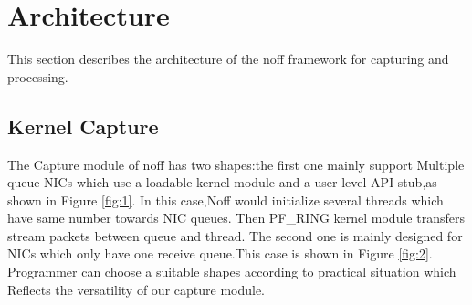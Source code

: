 \documentclass[conference]{IEEEtran}
\begin{document}
\section{Architecture}
This section describes the architecture of the noff framework for capturing and processing.
\subsection{Kernel Capture}
The Capture module of noff has two shapes:the first one mainly support Multiple queue NICs which use a loadable kernel module and a user-level API stub,as shown in Figure \ref{fig:1}. In this case,Noff would initialize several threads which have same number towards NIC queues.
Then PF\_RING kernel module transfers stream packets between queue and thread.
\newline\indent The second one is mainly designed for NICs which only have one receive queue.This case is shown in Figure \ref{fig:2}. Programmer can choose a suitable shapes according to practical situation which Reflects the versatility of our capture module.
\end{document}
